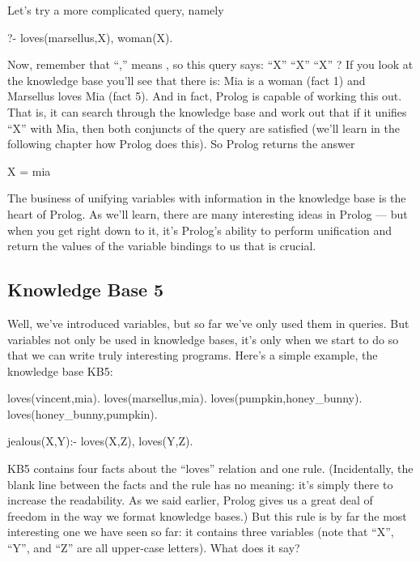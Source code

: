 Let's try a more complicated query, namely
\begin{LPNcodedisplay}
?- loves(marsellus,X), woman(X).
\end{LPNcodedisplay}
Now, remember that ``,'' means , so this query says:
 ``X''  ``X''  ``X'' ?  If you look at the
knowledge base you'll see that there is: Mia is a woman (fact 1) and
Marsellus loves Mia (fact 5).  And in fact, Prolog is capable of
working this out. That is, it can search through the knowledge base
and work out that if it unifies ``X'' with Mia, then both conjuncts of
the query are satisfied (we'll learn in the following chapter how
Prolog does this).  So Prolog returns the answer
\begin{LPNcodedisplay}
X = mia
\end{LPNcodedisplay}



The business of unifying variables with information in the knowledge
base is the heart of Prolog.  As we'll learn, there are many
interesting ideas in Prolog --- but when you get right down to it,
it's Prolog's ability to perform unification and return the values of
the variable bindings to us that is crucial.



\subsection*{Knowledge Base 5}\label{SUBSEC.L1.KB5}


Well, we've introduced variables, but so far we've only used them in
queries. But variables not only  be used in knowledge
bases, it's only when we start to do so that we can write truly
interesting programs.  Here's a simple example, the knowledge base
KB5:

\begin{LPNcodedisplay}
loves(vincent,mia).
loves(marsellus,mia).
loves(pumpkin,honey_bunny).
loves(honey_bunny,pumpkin).

jealous(X,Y):- loves(X,Z), loves(Y,Z).
\end{LPNcodedisplay}


KB5 contains four facts about the ``loves'' relation and one rule.
(Incidentally, the blank line between the facts and the rule has no
meaning: it's simply there to increase the readability. As we said
earlier, Prolog gives us a great deal of freedom in the way we format
knowledge bases.)  But this rule is by far the most interesting one we
have seen so far: it contains three variables (note that ``X'', ``Y'', and
``Z'' are all upper-case letters). What does it say?

